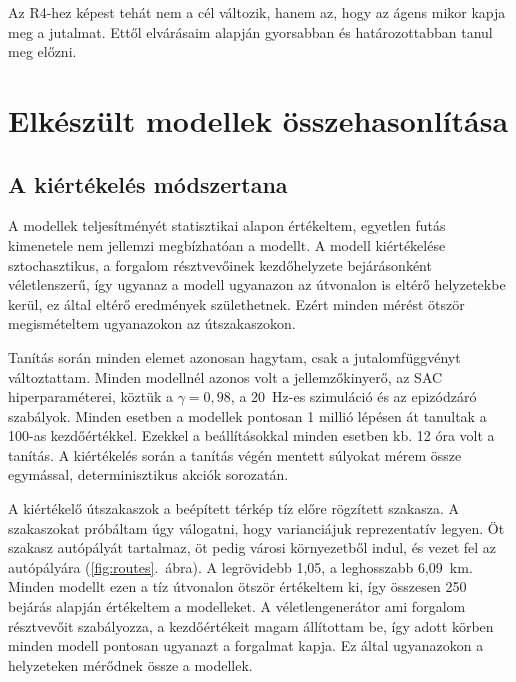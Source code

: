 \documentclass[a4paper,12pt,oneside]{article}
\begin{document}
Az R4-hez képest tehát nem a cél változik, hanem az, hogy az ágens mikor kapja meg a
jutalmat. Ettől elvárásaim alapján gyorsabban és határozottabban tanul meg előzni.

\section{Elkészült modellek összehasonlítása}
\label{sec:modells}

\subsection{A kiértékelés módszertana}
\label{subsec:eval_method}

A modellek teljesítményét statisztikai alapon értékeltem, egyetlen futás kimenetele nem
jellemzi megbízhatóan a modellt. A modell kiértékelése sztochasztikus, a forgalom résztvevőinek
kezdőhelyzete bejárásonként véletlenszerű, így ugyanaz a modell ugyanazon az útvonalon is
eltérő helyzetekbe kerül, ez által eltérő eredmények születhetnek. Ezért minden mérést ötször
megismételtem ugyanazokon az útszakaszokon.

Tanítás során minden elemet azonosan hagytam, csak a jutalomfüggvényt változtattam. Minden modellnél azonos volt a jellemzőkinyerő, az SAC hiperparaméterei, köztük a $\gamma = 0{,}98$, a 20~Hz-es szimuláció és az epizódzáró szabályok. 
Minden esetben a modellek pontosan 1 millió lépésen át tanultak a 100-as
kezdőértékkel. Ezekkel a beállításokkal minden esetben kb. 12 óra volt a tanítás. 
A kiértékelés során a tanítás végén mentett súlyokat mérem össze egymással, 
determinisztikus akciók sorozatán. 

A kiértékelő útszakaszok a beépített térkép tíz előre rögzített szakasza. 
A szakaszokat próbáltam úgy válogatni, hogy varianciájuk reprezentatív legyen. Öt szakasz 
autópályát tartalmaz, öt pedig
városi környezetből indul, és vezet fel az autópályára (\ref{fig:routes}.~ábra). 
A legrövidebb 1,05, a leghosszabb 6,09~km. 
Minden modellt ezen a tíz útvonalon ötször értékeltem ki, így összesen 250
bejárás alapján értékeltem a modelleket. 
A véletlengenerátor ami  forgalom résztvevőit szabályozza, a kezdőértékeit magam állítottam be, 
így adott körben minden modell pontosan ugyanazt a forgalmat kapja. Ez által 
ugyanazokon a helyzeteken mérődnek össze a modellek. 
\end{document}

